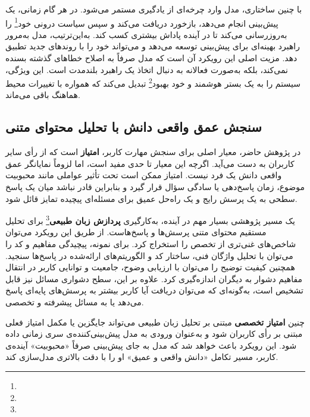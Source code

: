 با چنین ساختاری، مدل وارد چرخه‌ای از یادگیری مستمر می‌شود. در هر گام زمانی، یک پیش‌بینی انجام می‌دهد، بازخورد دریافت می‌کند و سپس سیاست درونی خود\footnote{} را به‌روزرسانی می‌کند تا در آینده پاداش بیشتری کسب کند. به‌این‌ترتیب، مدل به‌مرور راهبرد بهینه‌ای برای پیش‌بینی توسعه می‌دهد و می‌تواند خود را با روندهای جدید تطبیق دهد. مزیت اصلی این رویکرد آن است که مدل صرفاً به اصلاح خطاهای گذشته بسنده نمی‌کند، بلکه به‌صورت فعالانه به دنبال اتخاذ یک راهبرد بلندمدت است. این ویژگی، سیستم را به یک بستر هوشمند و خود بهبود\footnote{} تبدیل می‌کند که همواره با تغییرات محیط هماهنگ باقی می‌ماند.


\subsection{سنجش عمق واقعی دانش با تحلیل محتوای متنی}
در پژوهش حاضر، معیار اصلی برای سنجش مهارت کاربر، \textbf{امتیاز} است که از رأی سایر کاربران به دست می‌آید. اگرچه این معیار تا حدی مفید است، اما لزوماً نمایانگر عمق واقعی دانش یک فرد نیست. امتیاز ممکن است تحت تأثیر عواملی مانند محبوبیت موضوع، زمان پاسخ‌دهی یا سادگی سؤال قرار گیرد و بنابراین قادر نباشد میان یک پاسخ سطحی به یک پرسش رایج و یک راه‌حل عمیق برای مسئله‌ای پیچیده تمایز قائل شود.

یک مسیر پژوهشی بسیار مهم در آینده، به‌کارگیری \textbf{پردازش زبان طبیعی}\footnote{} برای تحلیل مستقیم محتوای متنی پرسش‌ها و پاسخ‌هاست. از طریق این رویکرد می‌توان شاخص‌های غنی‌تری از تخصص را استخراج کرد. برای نمونه، پیچیدگی مفاهیم و کد را می‌توان با تحلیل واژگان فنی، ساختار کد و الگوریتم‌های ارائه‌شده در پاسخ‌ها سنجید. همچنین کیفیت توضیح را می‌توان با ارزیابی وضوح، جامعیت و توانایی کاربر در انتقال مفاهیم دشوار به دیگران اندازه‌گیری کرد. علاوه بر این، سطح دشواری مسائل نیز قابل تشخیص است، به‌گونه‌ای که می‌توان دریافت آیا کاربر بیشتر به پرسش‌های پایه‌ای پاسخ می‌دهد یا به مسائل پیشرفته و تخصصی.

چنین \textbf{امتیاز تخصصی} مبتنی بر تحلیل زبان طبیعی می‌تواند جایگزین یا مکمل امتیاز فعلی مبتنی بر رأی کاربران شود و به‌عنوان ورودی به مدل پیش‌بینی‌کننده‌ی سری زمانی داده شود. این رویکرد باعث خواهد شد که مدل به جای پیش‌بینی صرفاً «محبوبیت» آینده‌ی کاربر، مسیر تکامل «دانش واقعی و عمیق» او را با دقت بالاتری مدل‌سازی کند.

